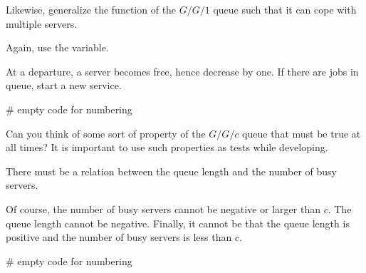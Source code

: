 \begin{exercise}
Likewise,   generalize  the  function of the $G/G/1$ queue such that it can cope with multiple servers.
\begin{hint}
  Again, use the  variable.
\end{hint}

\begin{solution}
  At a departure, a server becomes free, hence decrease  by one. If there are jobs in queue, start a new service.
\begin{pyverbatim}
# empty code for numbering
\end{pyverbatim}
\end{solution}
\end{exercise}

\begin{exercise}
  Can you think of some sort of property of the $G/G/c$ queue that must be true at all times? It is important to use such properties  as tests while developing.
\begin{hint}
    There must be a relation between the queue length and the number of busy servers.
\end{hint}
\begin{solution}
    Of course, the number of busy servers cannot be negative or larger than $c$. The queue length cannot be negative. Finally, it cannot be that  the queue length is positive and the number of busy servers is less than $c$.
\begin{pyverbatim}
# empty code for numbering
\end{pyverbatim}
  \end{solution}
\end{exercise}

